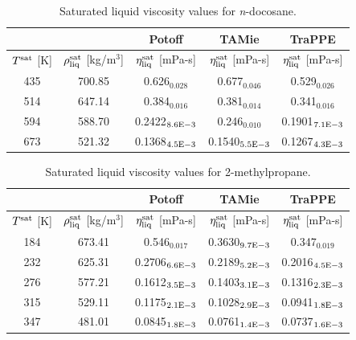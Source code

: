 \documentclass[preprint,review,11pt]{elsarticle}
\begin{document}
	\begin{table}[H]
		\caption{Saturated liquid viscosity values for \textit{n}-docosane.}
		\begin{center}
			\begin{tabular}{|c|c|c|c|c|}
				\hline
				&                                       & Potoff            & TAMie             & TraPPE            \\ \hline
				$T^{\rm sat}$ {[}K{]} & $\rho^{\rm sat}_{\rm liq}$ [kg/m$^3$] & $\eta_{\rm liq}^{\rm sat}$ {[}mPa-s{]} & $\eta_{\rm liq}^{\rm sat}$ {[}mPa-s{]} & $\eta_{\rm liq}^{\rm sat}$ {[}mPa-s{]} \\ \hline
				435 & 700.85 & 0.626$_{0.028}$   & 0.677$_{0.046}$   & 0.529$_{0.026}$   \\ \hline
				514 & 647.14 & 0.384$_{0.016}$   & 0.381$_{0.014}$   & 0.341$_{0.016}$   \\ \hline
				594 & 588.70 & 0.2422$_{8.6 \rm E-3}$ & 0.246$_{0.010}$   & 0.1901$_{7.1 \rm E-3}$ \\ \hline
				673 & 521.32 & 0.1368$_{4.5 \rm E-3}$ & 0.1540$_{5.5 \rm E-3}$ & 0.1267$_{4.3 \rm E-3}$ \\ \hline
			\end{tabular}
		\end{center}
	\end{table}
	
	\begin{table}[H]
		\caption{Saturated liquid viscosity values for 2-methylpropane.}
		\begin{center}
			\begin{tabular}{|c|c|c|c|c|}
				\hline
				&                                       & Potoff            & TAMie             & TraPPE            \\ \hline
				$T^{\rm sat}$ {[}K{]} & $\rho^{\rm sat}_{\rm liq}$ [kg/m$^3$] & $\eta_{\rm liq}^{\rm sat}$ {[}mPa-s{]} & $\eta_{\rm liq}^{\rm sat}$ {[}mPa-s{]} & $\eta_{\rm liq}^{\rm sat}$ {[}mPa-s{]} \\ \hline
				184 & 673.41 & 0.546$_{0.017}$   & 0.3630$_{9.7 \rm E-3}$ & 0.347$_{0.019}$   \\ \hline
				232 & 625.31 & 0.2706$_{6.6 \rm E-3}$ & 0.2189$_{5.2 \rm E-3}$ & 0.2016$_{4.5 \rm E-3}$ \\ \hline
				276 & 577.21 & 0.1612$_{3.5 \rm E-3}$ & 0.1403$_{3.1 \rm E-3}$ & 0.1316$_{2.3 \rm E-3}$ \\ \hline
				315 & 529.11 & 0.1175$_{2.1 \rm E-3}$ & 0.1028$_{2.9 \rm E-3}$ & 0.0941$_{1.8 \rm E-3}$ \\ \hline
				347 & 481.01 & 0.0845$_{1.8 \rm E-3}$ & 0.0761$_{1.4 \rm E-3}$ & 0.0737$_{1.6 \rm E-3}$ \\ \hline
			\end{tabular}
		\end{center}
	\end{table}
	
\end{document}
